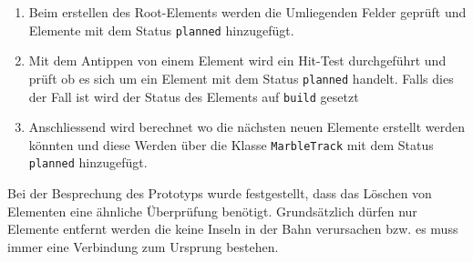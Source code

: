 \begin{description}
	\begin{enumerate}
		\item Beim erstellen des Root-Elements werden die Umliegenden Felder geprüft und Elemente mit dem Status \texttt{planned} hinzugefügt.
		\item Mit dem Antippen von einem Element wird ein Hit-Test durchgeführt und prüft ob es sich um ein Element mit dem Status \texttt{planned} handelt. Falls dies der Fall ist wird der Status des Elements auf \texttt{build} gesetzt
		\item Anschliessend wird berechnet wo die nächsten neuen Elemente erstellt werden könnten und diese Werden über die Klasse \texttt{MarbleTrack} mit dem Status \texttt{planned} hinzugefügt.
	\end{enumerate}

	Bei der Besprechung des Prototyps wurde festgestellt, dass das Löschen von Elementen eine ähnliche Überprüfung benötigt. Grundsätzlich dürfen nur Elemente entfernt werden die keine Inseln in der Bahn verursachen bzw. es muss immer eine Verbindung zum Ursprung bestehen.

\end{description}
